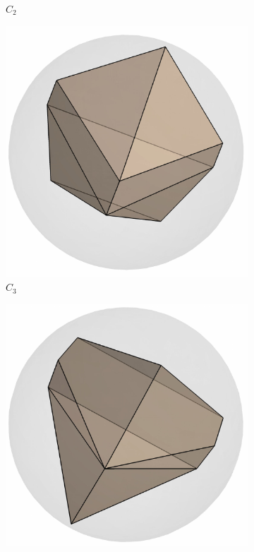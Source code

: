 \documentclass[12pt]{amsart}
\theoremstyle{plain}
\numberwithin{equation}{section}
\begin{document}
\begin{figure}[H]
\begin{subfigure}[b]{0.22\textwidth}
		\caption{$C_2$}
	\end{subfigure}
	\hfill
	\begin{subfigure}[b]{0.22\textwidth}
		\centering
		\includegraphics[scale=0.4]{./figures/small_C3.pdf}
		\caption{$C_3$}
	\end{subfigure}
	\hfill
	\begin{subfigure}[b]{0.22\textwidth}
		\centering
		\includegraphics[scale=0.4]{./figures/small_C4.pdf}

\end{subfigure}
\end{figure}
\end{document}
